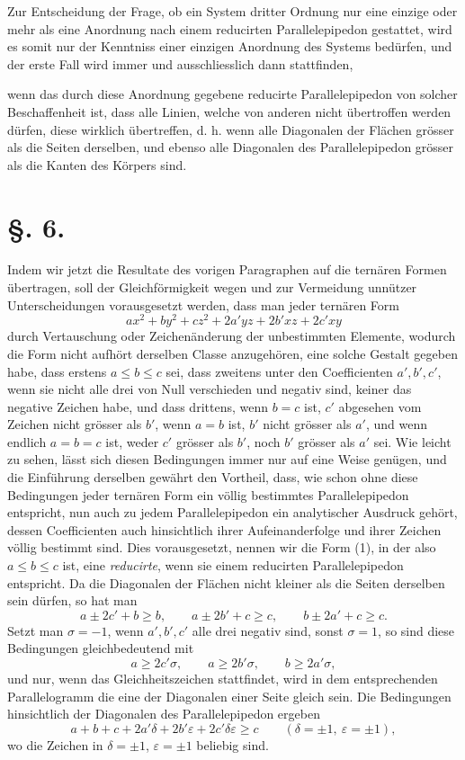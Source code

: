 \documentclass[11pt]{article}
\begin{document}
Zur Entscheidung der Frage, ob ein System dritter Ordnung nur eine einzige oder mehr als eine Anordnung nach einem reducirten Parallelepipedon gestattet, wird es somit nur der Kenntniss einer einzigen Anordnung des Systems bedürfen, und der erste Fall wird immer und ausschliesslich dann stattfinden,

wenn das durch diese Anordnung gegebene reducirte Parallelepipedon von solcher Beschaffenheit ist, dass alle Linien, welche von anderen nicht übertroffen werden dürfen, diese wirklich übertreffen, d. h. wenn alle Diagonalen der Flächen grösser als die Seiten derselben, und ebenso alle Diagonalen des Parallelepipedon grösser als die Kanten des Körpers sind.

\section*{§. 6.}

Indem wir jetzt die Resultate des vorigen Paragraphen auf die ternären Formen übertragen, soll der Gleichförmigkeit wegen und zur Vermeidung unnützer Unterscheidungen vorausgesetzt werden, dass man jeder ternären Form
\begin{equation}
 ax^2+by^2+cz^2+2a'yz+2b'xz+2c'xy
\end{equation}
durch Vertauschung oder Zeichenänderung der unbestimmten Elemente, wodurch die Form nicht aufhört derselben Classe anzugehören, eine solche Gestalt gegeben habe, dass erstens $a\le b\le c$ sei, dass zweitens unter den Coefficienten $a',b',c'$, wenn sie nicht alle drei von Null verschieden und negativ sind, keiner das negative Zeichen habe, und dass drittens, wenn $b=c$ ist, $c'$ abgesehen vom Zeichen nicht grösser als $b'$, wenn $a=b$ ist, $b'$ nicht grösser als $a'$, und wenn endlich $a=b=c$ ist, weder $c'$ grösser als $b'$, noch $b'$ grösser als $a'$ sei. Wie leicht zu sehen, lässt sich diesen Bedingungen immer nur auf eine Weise genügen, und die Einführung derselben gewährt den Vortheil, dass, wie schon ohne diese Bedingungen jeder ternären Form ein völlig bestimmtes Parallelepipedon entspricht, nun auch zu jedem Parallelepipedon ein analytischer Ausdruck gehört, dessen Coefficienten auch hinsichtlich ihrer Aufeinanderfolge und ihrer Zeichen völlig bestimmt sind. Dies vorausgesetzt, nennen wir die Form (1), in der also $a\le b\le c$ ist, eine \emph{reducirte}, wenn sie einem reducirten Parallelepipedon entspricht. Da die Diagonalen der Flächen nicht kleiner als die Seiten derselben sein dürfen, so hat man
\[
 a\pm2c'+b\ge b,
 \qquad a\pm2b'+c\ge c,
 \qquad b\pm2a'+c\ge c.
\]
Setzt man $\sigma=-1$, wenn $a',b',c'$ alle drei negativ sind, sonst $\sigma=1$, so sind diese Bedingungen gleichbedeutend mit
\begin{equation}
 a\ge 2c'\sigma,
 \qquad a\ge 2b'\sigma,
 \qquad b\ge 2a'\sigma,
\end{equation}
und nur, wenn das Gleichheitszeichen stattfindet, wird in dem entsprechenden Parallelogramm die eine der Diagonalen einer Seite gleich sein. Die Bedingungen hinsichtlich der Diagonalen des Parallelepipedon ergeben
\[
 a+b+c+2a'\delta+2b'\varepsilon+2c'\delta\varepsilon\ge c
 \qquad (\delta=\pm1,\ \varepsilon=\pm1),
\]
wo die Zeichen in $\delta=\pm1$, $\varepsilon=\pm1$ beliebig sind.
\end{document}
